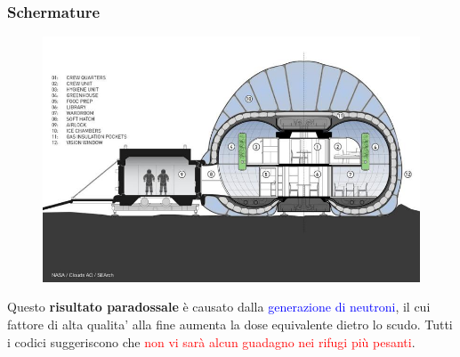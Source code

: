 \documentclass[9pt]{beamer}
\begin{document}

\begin{frame} [fragile]
	\frametitle{Schermature}
	\begin{figure}
	  \centering
			\includegraphics[scale=.30]{figures/fig4.jpg}
		\end{figure}
Questo \textbf{risultato paradossale} \`e causato dalla \textcolor{blue}{generazione di neutroni}, il cui fattore di alta qualita' alla fine aumenta la dose equivalente dietro lo scudo. Tutti i codici suggeriscono che \textcolor{red}{non vi sar\`a alcun guadagno nei rifugi pi\`u pesanti}.
\end{frame}


\end{document}
